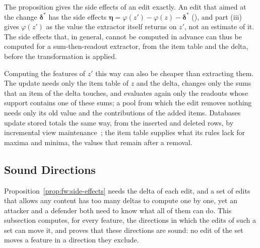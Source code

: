 The proposition gives the side effects of an edit exactly. An edit that aimed at the change $\boldsymbol{\delta}^*$
has the side effects $\boldsymbol{\eta} = \varphi(z') - \varphi(z) - \boldsymbol{\delta}^*$ (),
and part (iii) gives $\varphi(z')$ as the value the extractor itself returns on $z'$, not an estimate of it. The side
effects that, in general, cannot be computed in advance can thus be computed for a sum-then-readout extractor, from
the item table and the delta, before the transformation is applied.

Computing the features of $z'$ this way can also be cheaper than extracting them. The update needs only the item table
of $z$ and the delta, changes only the sums that an item of the delta touches, and evaluates again only the
readouts whose support contains one of these sums; a pool from which the edit removes nothing needs only its old value
and the contributions of the added items. Databases update stored totals the same way, from the inserted and deleted
rows, by incremental view maintenance~\cite{gupta1995maintenance,koch2014dbtoaster}; the item table supplies what its
rules lack for maxima and minima, the values that remain after a removal.

\subsection{Sound Directions}
\label{sec:fw:directions}

Proposition~\ref{prop:fw:side-effects} needs the delta of each edit, and a set of edits that allows any content
has too many deltas to compute one by one, yet an attacker and a defender both need to know what all of them can do.
This subsection computes, for every feature, the directions in which the edits of such a set can move it, and proves
that these directions are sound: no edit of the set moves a feature in a direction they exclude.

